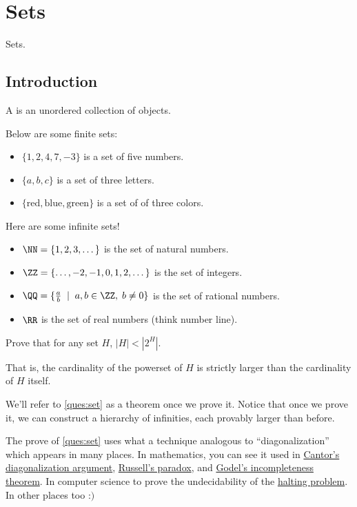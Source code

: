 \section{Sets}
\label{sets}

Sets.

\subsection{Introduction}


\begin{definition}
    A  is an unordered collection of objects.
\end{definition}

\begin{example}
    Below are some finite sets:
    \begin{itemize}
        \item $\{1, 2, 4, 7, -3\}$ is a set of five numbers.
        \item $\{a, b, c\}$ is a set of three letters.
        \item $\{\text{red}, \text{blue}, \text{green}\}$ is a set of of three colors.
    \end{itemize}
    Here are some infinite sets!
    \begin{itemize}
        \item $\NN = \{1, 2, 3, \dots\}$ is the set of natural numbers.
        \item $\ZZ = \{\dots, -2, -1, 0, 1, 2, \dots\}$ is the set of integers.
        \item $\QQ = \{\frac{a}{b} \; \mid \; a, b \in \ZZ, \; b \neq 0\}$ is the set of rational numbers.
        \item $\RR$ is the set of real numbers (think number line).
    \end{itemize}
\end{example}

\begin{ques}
    \label{ques:set}
    Prove that for any set $H$, $|H| < |2^H|$. 
    
    That is, the cardinality of the powerset of $H$ is strictly larger than the cardinality of $H$ itself.
\end{ques}

We'll refer to \ref{ques:set} as a theorem once we prove it. Notice that once we prove it, we can construct a hierarchy of infinities, each provably larger than before.

\begin{remark}
    The prove of \ref{ques:set} uses what a technique analogous to ``diagonalization'' which appears in many places. In mathematics, you can see it used in \href{https://en.wikipedia.org/wiki/Cantor%27s_diagonal_argument}{Cantor's diagonalization argument}, \href{https://en.wikipedia.org/wiki/Russell%27s_paradox}{Russell's paradox}, and \href{https://en.wikipedia.org/wiki/G%C3%B6del%27s_incompleteness_theorems}{Godel's incompleteness theorem}. In computer science to prove the undecidability of the \href{https://en.wikipedia.org/wiki/Halting_problem}{halting problem}. In other places too :$)$
\end{remark}
